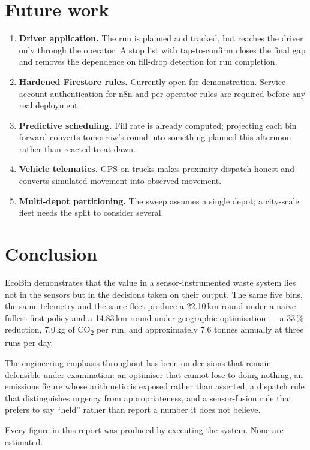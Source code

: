 \documentclass[11pt,a4paper]{article}
\newcommand{\co}{CO\textsubscript{2}}
\begin{document}
\section{Future work}

\begin{enumerate}
  \item \textbf{Driver application.} The run is planned and tracked, but
        reaches the driver only through the operator. A stop list with
        tap-to-confirm closes the final gap and removes the dependence on
        fill-drop detection for run completion.
  \item \textbf{Hardened Firestore rules.} Currently open for demonstration.
        Service-account authentication for n8n and per-operator rules are
        required before any real deployment.
  \item \textbf{Predictive scheduling.} Fill rate is already computed;
        projecting each bin forward converts tomorrow's round into
        something planned this afternoon rather than reacted to at dawn.
  \item \textbf{Vehicle telematics.} GPS on trucks makes proximity dispatch
        honest and converts simulated movement into observed movement.
  \item \textbf{Multi-depot partitioning.} The sweep assumes a single depot;
        a city-scale fleet needs the split to consider several.
\end{enumerate}

\section{Conclusion}

EcoBin demonstrates that the value in a sensor-instrumented waste system
lies not in the sensors but in the decisions taken on their output. The
same five bins, the same telemetry and the same fleet produce a 22.10\,km
round under a naive fullest-first policy and a 14.83\,km round under
geographic optimisation --- a 33\,\% reduction, 7.0\,kg of \co{} per run,
and approximately 7.6 tonnes annually at three runs per day.

The engineering emphasis throughout has been on decisions that remain
defensible under examination: an optimiser that cannot lose to doing
nothing, an emissions figure whose arithmetic is exposed rather than
asserted, a dispatch rule that distinguishes urgency from appropriateness,
and a sensor-fusion rule that prefers to say ``held'' rather than report a
number it does not believe.

\vfill
\begin{center}\small
\textcolor{inksoft}{Every figure in this report was produced by executing the system. None are estimated.}
\end{center}
\end{document}
